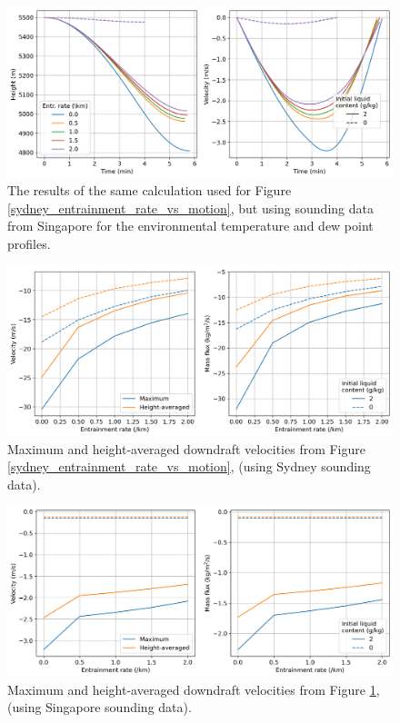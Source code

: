 \documentclass[12pt,titlepage]{article}
\begin{document}
\begin{figure}[ht]
	\centering
	\includegraphics[width=0.8\linewidth]
		{figures/20211027_experiments_singapore/entrainment_rate_vs_motion}
	\caption{
		The results of the same calculation used for Figure
		\ref{sydney_entrainment_rate_vs_motion}, but using sounding data
		from Singapore for the environmental temperature and dew point
		profiles.}
	\label{singapore_entrainment_rate_vs_motion}
\end{figure}

\begin{figure}[ht]
	\centering
	\includegraphics[width=0.8\linewidth]
		{figures/20211026_experiments_sydney/entrainment_rate_vs_velocity}
	\caption{
		Maximum and height-averaged downdraft velocities from Figure
		\ref{sydney_entrainment_rate_vs_motion}, (using Sydney sounding
		data).}
	\label{sydney_entrainment_rate_vs_velocity}
\end{figure}

\begin{figure}[ht]
	\centering
	\includegraphics[width=0.8\linewidth]
		{figures/20211027_experiments_singapore/entrainment_rate_vs_velocity}
	\caption{
		Maximum and height-averaged downdraft velocities from Figure
		\ref{singapore_entrainment_rate_vs_motion}, (using Singapore sounding
		data).}
	\label{singapore_entrainment_rate_vs_velocity}
\end{figure}
\end{document}
